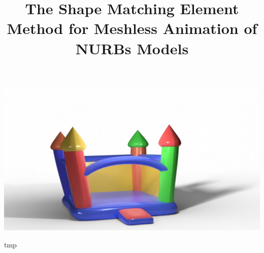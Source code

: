 \documentclass[sigconf]{acmart}
\begin{document}
\title{The Shape Matching Element Method for Meshless Animation of NURBs Models}

\begin{teaserfigure}
  \includegraphics[width=\textwidth]{castle.png}
  \caption{tmp}
  \Description{}
  \label{fig:teaser}
\end{teaserfigure}

\maketitle










\end{document}
